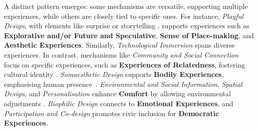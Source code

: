 

A distinct pattern emerges: some mechanisms are versatile, supporting multiple experiences, while others are closely tied to specific ones. For instance, \textit{Playful Design}, with elements like surprise \cite{petersen2007squeeze} or storytelling \cite{hirsch2023re}, supports experiences such as \textbf{Explorative and/or Future and Speculative}, \textbf{Sense of Place-making}, and \textbf{Aesthetic Experiences}. Similarly, \textit{Technological Immersion} spans diverse experiences. In contrast, mechanisms like \textit{Community and Social Connection} focus on specific experiences, such as \textbf{Experiences of Relatedness}, fostering cultural identity \cite{nabil2020peace}. \textit{Somaesthetic Design} supports \textbf{Bodily Experiences}, emphasising human presence~\cite{zboinska2019expressing}. \textit{Environmental and Social Information}, \textit{Spatial Design}, and \textit{Personalisation} enhance \textbf{Comfort} by allowing environmental adjustments \cite{olsen2017wizard}. \textit{Biophilic Design} connects to \textbf{Emotional Experiences}, and \textit{Participation and Co-design} promotes civic inclusion for \textbf{Democratic Experiences}.

